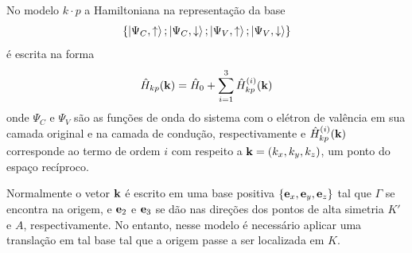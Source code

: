 No modelo $ k \cdot p $ a Hamiltoniana na representação da base
\begin{equation}
  \left\{ \ket{\Psi_C,\uparrow} ; \ket{\Psi_C,\downarrow} ; \ket{\Psi_V,\uparrow} ; \ket{\Psi_V,\downarrow} \right\}
  \label{eq:basis}
\end{equation}
é escrita na forma
\begin{equation}
  \hat{H}_{kp}(\mathbf{k}) = \hat{H}_0 + \sum_{i=1}^3 \hat{H}_{kp}^{(i)}(\mathbf{k})
  \label{eq:total_ham}
\end{equation}
onde $ \Psi_C $ e $ \Psi_V $ são as funções de onda do sistema com o elétron de
valência em sua camada original e na camada de condução, respectivamente e 
$ \hat{H}_{kp}^{(i)}(\mathbf{k}) $ corresponde ao termo de ordem $ i $ com respeito
a $ \mathbf{k} = (k_x, k_y, k_z) $, um ponto do espaço recíproco. 

Normalmente o vetor $ \mathbf{k} $ é escrito em uma base positiva 
$ \{\mathbf{e}_x,\mathbf{e}_y,\mathbf{e}_z\} $ tal que $\Gamma$ se encontra na origem, e
$ \mathbf{e}_2 $ e $ \mathbf{e}_3 $ se dão nas direções dos pontos de alta simetria
$K'$ e $A$, respectivamente. No entanto, nesse modelo é necessário aplicar uma
translação em tal base tal que a origem passe a ser localizada em $K$.

